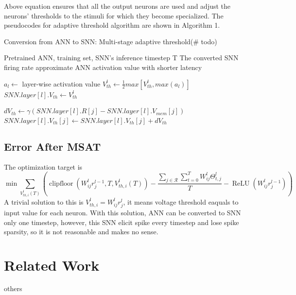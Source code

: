 \documentclass{article}
\begin{document}
Above equation ensures that all the output neurons are used and adjust the neurons’ thresholds to the
stimuli for which they become specialized.
The pseudocodes for adaptive threshold algorithm are shown in Algorithm 1.
\begin{algorithm}[h] 
	\caption{Conversion from ANN to SNN: Multi-stage adaptive threshold(\# todo)} 
	\begin{algorithmic}[1] 
		\Require 
    Pretrained ANN, training set,  SNN's inference timestep T
		\Ensure 
		The converted SNN firing rate approximate ANN activation value with shorter latency

      \State $a_l \gets$ layer-wise activation value
        \State $V_{th}^l \gets \frac{1}{2}max[V_{th}^l, max(a_l)]$
        \State $SNN.layer[l].V_{th} \gets V_{th}^l$
      \EndFor
    \EndFor

          \State $dV_{th} \gets \gamma(SNN.layer[l].R[j] - SNN.layer[l].V_{mem}[j])$
          \State $SNN.layer[l].V_{th}[j] \gets SNN.layer[l].V_{th}[j] + dV_{th}$
        \EndFor
      \EndFor
    \EndFor

	\end{algorithmic} 
\end{algorithm}

\subsection{Error After MSAT}

The optimization target is 
\begin{equation}
  \operatorname{min}\sum\limits_{V_{th,i}^l(T)}\left(\operatorname{clipfloor}\left(W_{ij}^lr_j^{l-1}, T, V_{th,i}^l(T)\right) - \frac{\sum_{j \in \mathcal{R}} \sum_{t=0}^TW_{ij}^l\Theta_{t,j}^l }{T} - \operatorname{ReLU}\left(W_{ij}^lr_j^{l-1}\right)\right)
\end{equation}
A trivial solution to this is $V_{th,i}^l=W_{ij}^lr_j^l$, it means voltage threshold eaquals to input value for each neuron. With this solution, ANN can be converted to SNN only one timestep, however, this SNN elicit spike every timestep and lose spike sparsity, so it is not reasonable and makes no sense.

\section{Related Work}
others
\end{document}
